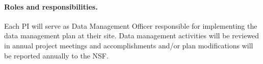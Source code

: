 \paragraph*{Roles and responsibilities.}
Each PI %
will serve as Data Management
Officer responsible for implementing the data management plan at their
site. Data management activities will be reviewed in annual project
meetings and accomplishments and/or plan modifications will be
reported annually to the NSF.
